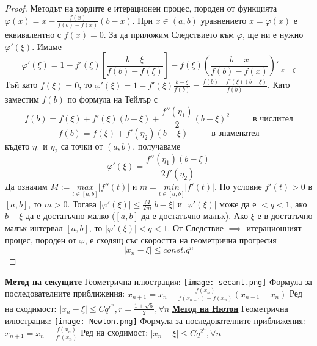 \documentclass{article}
\begin{document}
\begin{proof}
Методът на хордите е итерационен процес, породен от функцията $\varphi(x) = x - \frac{f(x)}{f(b) - f(x)}(b - x)$. При $x \in (a, b)$
уравнението $x = \varphi(x)$ е еквивалентно с $f(x) = 0$. За да приложим Следствието към $\varphi$, ще ни е нужно $\varphi'(\xi)$.
Имаме $$\varphi'(\xi) = 1 - f'(\xi)[\frac{b - \xi}{f(b) - f(\xi)}] - f(\xi)(\frac{b - x}{f(b) - f(x)})'|_{x = \xi}$$ Тъй като
$f(\xi) = 0$, то $\varphi'(\xi) = 1 - f'(\xi)\frac{b - \xi}{f(b)} = \frac{f(b) - f'(\xi)(b - \xi)}{f(b)}$. Като заместим $f(b)$
по формула на Тейлър с $$f(b) = f(\xi) + f'(\xi)(b - \xi) + \frac{f''(\eta_1)}{2}(b - \xi)^2 \hspace{1cm} \text{ в числител}$$
$$f(b) = f(\xi) + f'(\eta_2)(b - \xi) \hspace{1cm} \text{ в знаменател}$$ където $\eta_1$ и $\eta_2$ са точки от $(a, b)$,
получаваме $$\varphi'(\xi) = \frac{f''(\eta_1)(b - \xi)}{2f'(\eta_2)}$$
Да означим $M := \underset{t \in [a, b]}{max} |f''(t)|$ и $m = \underset{t \in [a, b]}{min} |f'(t)|$. По условие $f'(t) > 0$ в
$[a, b]$, то $m > 0$. Тогава $|\varphi'(\xi)| \le \frac{M}{2m}|b - \xi|$ и $|\varphi'(\xi)|$ може да е $< q < 1$, ако
$b - \xi$ да е достатъчно малко ($[a, b]$ да е достатъчно малък). Ако $\xi$ е в достатъчно малък интервал $[a, b]$, то
$|\varphi'(\xi)| < q < 1$. От Следствие $\implies$ итерационният процес, породен от $\varphi$, е сходящ със скоростта на
геометрична прогресия $$|x_n - \xi| \le const . q^n$$
\end{proof}
\textbf{\underline{Метод на секущите}} \newline
Геометрична илюстрация: \texttt{[image: secant.png]} \newline\newline
Формула за последователните приближения: $x_{n+1} = x_n - \frac{f(x_n)}{f(x_{n-1}) - f(x_n)}(x_{n-1} - x_n)$ \newline
Ред на сходимост: $|x_n - \xi| \le Cq^{r^n}, r = \frac{1 + \sqrt{5}}{2}, \forall n$ \newline\newline
\textbf{\underline{Метод на Нютон}} \newline
Геометрична илюстрация: \texttt{[image: Newton.png]} \newline\newline
Формула за последователните приближения: $x_{n+1} = x_n - \frac{f(x_n)}{f'(x_n)}$ \newline
Ред на сходимост: $|x_n - \xi| \le Cq^{2^n}, \forall n$ \newline
\end{document}
